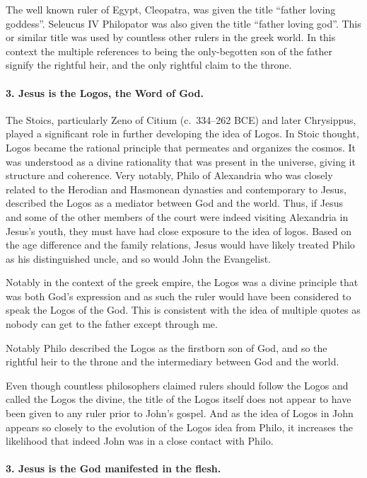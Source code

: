 The well known ruler of Egypt, Cleopatra, was given the title ``father loving goddess''.
Seleucus IV Philopator was also given the title ``father loving god''.
This or similar title was used by countless other rulers in the greek world.
In this context the multiple references to being the only-begotten son of the father signify the rightful heir, and the only rightful claim to the throne.

\paragraph{3.
Jesus is the Logos, the Word of God.}\label{par:jesus-is-the-logos-the-word-of-god.}

The Stoics, particularly Zeno of Citium (c.~334--262 BCE) and later Chrysippus, played a significant role in further developing the idea of Logos.
In Stoic thought, Logos became the rational principle that permeates and organizes the cosmos.
It was understood as a divine rationality that was present in the universe, giving it structure and coherence.
Very notably, Philo of Alexandria who was closely related to the Herodian and Hasmonean dynasties and contemporary to Jesus, described the Logos as a mediator between God and the world.
Thus, if Jesus and some of the other members of the court were indeed visiting Alexandria in Jesus's youth, they must have had close exposure to the idea of logos.
Based on the age difference and the family relations, Jesus would have likely treated Philo as his distinguished uncle, and so would John the Evangelist.

Notably in the context of the greek empire, the Logos was a divine principle that was both God's expression and as such the ruler would have been considered to speak the Logos of the God.
This is consistent with the idea of multiple quotes as nobody can get to the father except through me.

Notably Philo described the Logos as the firstborn son of God, and so the rightful heir to the throne and the intermediary between God and the world.

Even though countless philosophers claimed rulers should follow the Logos and called the Logos the divine, the title of the Logos itself does not appear to have been given to any ruler prior to John's gospel.
And as the idea of Logos in John appears so closely to the evolution of the Logos idea from Philo, it increases the likelihood that indeed John was in a close contact with Philo.

\paragraph{3.
Jesus is the God manifested in the flesh.}\label{par:jesus-is-the-god-manifested-in-the-flesh.}


